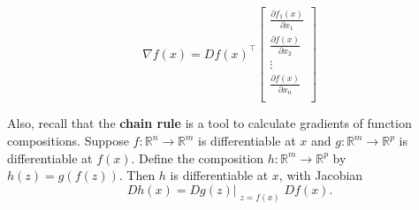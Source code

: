 \documentclass[12pt]{article}
\begin{document}
\begin{equation}
    \nabla f(x) = D f(x)^\intercal
    \begin{bmatrix}
        \frac{\partial f_1(x)}{\partial x_1}  \\
        \frac{\partial f(x)}{\partial x_2}  \\
        \vdots                                \\   
        \frac{\partial f(x)}{\partial x_n}  \\
    \end{bmatrix}
\end{equation}

\noindent Also, recall that the \textbf{chain rule} is a tool to calculate gradients of function compositions.
Suppose $f : \mathbb{R}^n \rightarrow \mathbb{R}^m$ is differentiable at $x$ and $g : \mathbb{R}^m \rightarrow \mathbb{R}^p$ is differentiable at $f(x)$.
Define the composition $h : \mathbb{R}^m \rightarrow \mathbb{R}^p$ by $h(z)= g(f(z))$. Then $h$ is differentiable at $x$, with Jacobian
\begin{equation}
    Dh(x) = Dg(z)\Bigr|_{\substack{z=f(x)}} Df(x). 
\end{equation}
\end{document}
